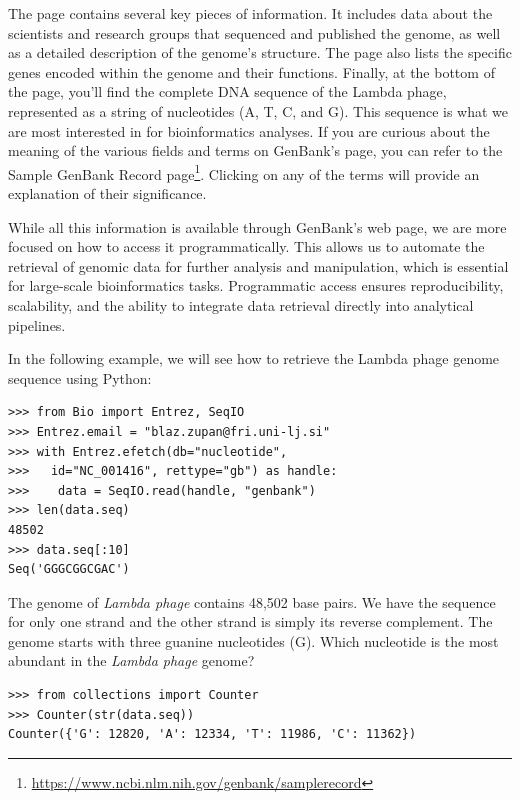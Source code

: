 The page
contains several key pieces of information.
It includes data about the scientists and research groups that sequenced and published the genome, as well as a detailed description of the genome’s structure. The page also lists the specific genes encoded within the genome and their functions. Finally, at the bottom of the page, you'll find the complete DNA sequence of the Lambda phage, represented as a string of nucleotides (A, T, C, and G). This sequence is what we are most interested in for bioinformatics analyses. If you are curious about the meaning of the various fields and terms on GenBank's page, you can refer to the Sample GenBank Record page\footnote{\url{https://www.ncbi.nlm.nih.gov/genbank/samplerecord}}. Clicking on any of the terms will provide an explanation of their significance.

While all this information is available through GenBank's web page, we are more focused on how to access it programmatically. This allows us to automate the retrieval of genomic data for further analysis and manipulation, which is essential for large-scale bioinformatics tasks. Programmatic access ensures reproducibility, scalability, and the ability to integrate data retrieval directly into analytical pipelines. 

In the following example, we will see how to retrieve the Lambda phage genome sequence using Python:

\vspace*{3mm}
\begin{lstlisting}
>>> from Bio import Entrez, SeqIO
>>> Entrez.email = "blaz.zupan@fri.uni-lj.si"
>>> with Entrez.efetch(db="nucleotide", 
>>>   id="NC_001416", rettype="gb") as handle:
>>>    data = SeqIO.read(handle, "genbank")
>>> len(data.seq)
48502
>>> data.seq[:10]
Seq('GGGCGGCGAC')
\end{lstlisting}

The genome of {\em Lambda phage} contains 48,502 base pairs. We have the sequence for only one strand and the other strand is simply its reverse complement. The genome starts with three guanine nucleotides (G). Which nucleotide is the most abundant in the {\em Lambda phage} genome?

\vspace*{3mm}
\begin{lstlisting}
>>> from collections import Counter
>>> Counter(str(data.seq))
Counter({'G': 12820, 'A': 12334, 'T': 11986, 'C': 11362})
\end{lstlisting}

